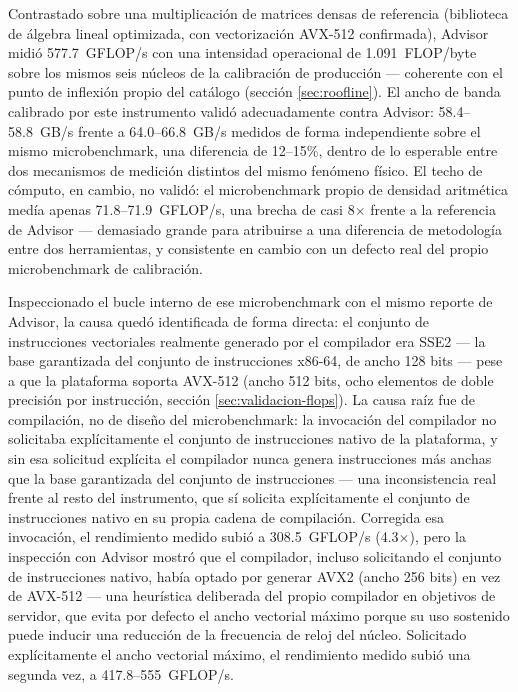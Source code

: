 \documentclass[12pt,oneside,spanish]{book}
\begin{document}
Contrastado sobre una multiplicación de matrices densas de referencia (biblioteca de álgebra lineal optimizada, con vectorización AVX-512 confirmada), Advisor midió 577.7~GFLOP/s con una intensidad operacional de 1.091~FLOP/byte sobre los mismos seis núcleos de la calibración de producción --- coherente con el punto de inflexión propio del catálogo (sección \ref{sec:roofline}). El ancho de banda calibrado por este instrumento validó adecuadamente contra Advisor: 58.4--58.8~GB/s frente a 64.0--66.8~GB/s medidos de forma independiente sobre el mismo microbenchmark, una diferencia de 12--15\%, dentro de lo esperable entre dos mecanismos de medición distintos del mismo fenómeno físico. El techo de cómputo, en cambio, no validó: el microbenchmark propio de densidad aritmética medía apenas 71.8--71.9~GFLOP/s, una brecha de casi 8$\times$ frente a la referencia de Advisor --- demasiado grande para atribuirse a una diferencia de metodología entre dos herramientas, y consistente en cambio con un defecto real del propio microbenchmark de calibración.

Inspeccionado el bucle interno de ese microbenchmark con el mismo reporte de Advisor, la causa quedó identificada de forma directa: el conjunto de instrucciones vectoriales realmente generado por el compilador era SSE2 --- la base garantizada del conjunto de instrucciones x86-64, de ancho 128 bits --- pese a que la plataforma soporta AVX-512 (ancho 512 bits, ocho elementos de doble precisión por instrucción, sección \ref{sec:validacion-flops}). La causa raíz fue de compilación, no de diseño del microbenchmark: la invocación del compilador no solicitaba explícitamente el conjunto de instrucciones nativo de la plataforma, y sin esa solicitud explícita el compilador nunca genera instrucciones más anchas que la base garantizada del conjunto de instrucciones --- una inconsistencia real frente al resto del instrumento, que sí solicita explícitamente el conjunto de instrucciones nativo en su propia cadena de compilación. Corregida esa invocación, el rendimiento medido subió a 308.5~GFLOP/s (4.3$\times$), pero la inspección con Advisor mostró que el compilador, incluso solicitando el conjunto de instrucciones nativo, había optado por generar AVX2 (ancho 256 bits) en vez de AVX-512 --- una heurística deliberada del propio compilador en objetivos de servidor, que evita por defecto el ancho vectorial máximo porque su uso sostenido puede inducir una reducción de la frecuencia de reloj del núcleo. Solicitado explícitamente el ancho vectorial máximo, el rendimiento medido subió una segunda vez, a 417.8--555~GFLOP/s.
\end{document}
